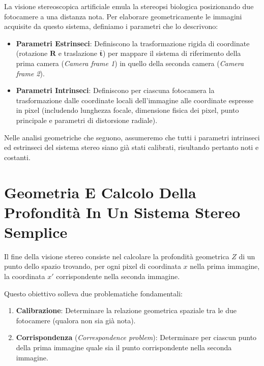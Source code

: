 ﻿\documentclass[11pt, a4paper]{article}
\begin{document}
La visione stereoscopica artificiale emula la stereopsi biologica posizionando due fotocamere a una distanza nota. Per elaborare geometricamente le immagini acquisite da questo sistema, definiamo i parametri che lo descrivono:


\begin{itemize}[noitemsep]
    \item \textbf{Parametri Estrinseci}: Definiscono la trasformazione rigida di coordinate (rotazione $\bm{R}$ e traslazione $\bar{\bm{t}}$) per mappare il sistema di riferimento della prima camera (\emph{Camera frame 1}) in quello della seconda camera (\emph{Camera frame 2}).
    \item \textbf{Parametri Intrinseci}: Definiscono per ciascuna fotocamera la trasformazione dalle coordinate locali dell'immagine alle coordinate espresse in pixel (includendo lunghezza focale, dimensione fisica dei pixel, punto principale e parametri di distorsione radiale).
\end{itemize}

Nelle analisi geometriche che seguono, assumeremo che tutti i parametri intrinseci ed estrinseci del sistema stereo siano già stati calibrati, risultando pertanto noti e costanti.

\newpage

\section{Geometria E Calcolo Della Profondità In Un Sistema Stereo Semplice}

Il fine della visione stereo consiste nel calcolare la profondità geometrica $Z$ di un punto dello spazio trovando, per ogni pixel di coordinata $x$ nella prima immagine, la coordinata $x'$ corrispondente nella seconda immagine.


Questo obiettivo solleva due problematiche fondamentali:
\begin{enumerate}[noitemsep]
    \item \textbf{Calibrazione}: Determinare la relazione geometrica spaziale tra le due fotocamere (qualora non sia già nota).
    \item \textbf{Corrispondenza} (\emph{Correspondence problem}): Determinare per ciascun punto della prima immagine quale sia il punto corrispondente nella seconda immagine.
\end{enumerate}
\end{document}

